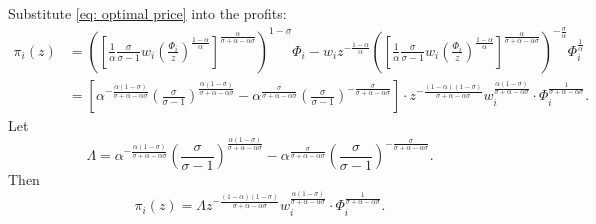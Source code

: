 \documentclass[12pt,letterpaper]{article}
\begin{document}
Substitute \ref{eq: optimal price} into the profits:
\begin{align}
    \pi_{i}(z)&=\left(\left[\frac{1}{\alpha}\frac{\sigma}{\sigma-1}w_{i}\left(\frac{\Phi_{i}}{z} \right)^{\frac{1-\alpha}{\alpha}} \right]^{\frac{\alpha}{\sigma+\alpha-\alpha\sigma}} \right)^{1-\sigma}\Phi_{i}
    -w_{i}z^{-\frac{1-\alpha}{\alpha}}
    \left(\left[\frac{1}{\alpha}\frac{\sigma}{\sigma-1}w_{i}\left(\frac{\Phi_{i}}{z} \right)^{\frac{1-\alpha}{\alpha}} \right]^{\frac{\alpha}{\sigma+\alpha-\alpha\sigma}} \right)^{-\frac{\sigma}{\alpha}}\Phi_{i}^{\frac{1}{\alpha}}\\
    &=\left[\alpha^{-\frac{\alpha(1-\sigma)}{\sigma+\alpha-\alpha\sigma}}\left(\frac{\sigma}{\sigma-1} \right)^{\frac{\alpha(1-\sigma)}{\sigma+\alpha-\alpha\sigma}}-\alpha^{\frac{\sigma}{\sigma+\alpha-\alpha\sigma}}\left(\frac{\sigma}{\sigma-1} \right)^{-\frac{\sigma}{\sigma+\alpha-\alpha\sigma}} \right]\cdot z^{-\frac{(1-\alpha)(1-\sigma)}{\sigma+\alpha-\alpha\sigma}}w_{i}^{\frac{\alpha(1-\sigma)}{\sigma+\alpha-\alpha\sigma}}\cdot \Phi_{i}^{\frac{1}{\sigma+\alpha-\alpha\sigma}}.
\end{align}
Let
\begin{equation}
    \Lambda = \alpha^{-\frac{\alpha(1-\sigma)}{\sigma+\alpha-\alpha\sigma}}\left(\frac{\sigma}{\sigma-1} \right)^{\frac{\alpha(1-\sigma)}{\sigma+\alpha-\alpha\sigma}}-\alpha^{\frac{\sigma}{\sigma+\alpha-\alpha\sigma}}\left(\frac{\sigma}{\sigma-1} \right)^{-\frac{\sigma}{\sigma+\alpha-\alpha\sigma}} .
\end{equation}
Then
\begin{equation}
    \pi_{i}(z)=\Lambda z^{-\frac{(1-\alpha)(1-\sigma)}{\sigma+\alpha-\alpha\sigma}}w_{i}^{\frac{\alpha(1-\sigma)}{\sigma+\alpha-\alpha\sigma}}\cdot \Phi_{i}^{\frac{1}{\sigma+\alpha-\alpha\sigma}}.
\end{equation}
\end{document}
